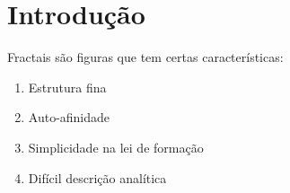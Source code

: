 \chapter{Introdução}
 
Fractais são figuras que tem certas características:
\begin{enumerate}

\item Estrutura fina
\item Auto-afinidade
\item Simplicidade na lei de formação
\item Difícil descrição analítica
    
\end{enumerate}